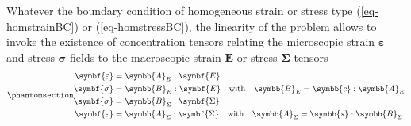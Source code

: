 \documentclass[
  a4paper,
  numbers=noendperiod,
  DIV=12]{scrreprt}
\newcommand{\uu}[1]{{\symbf{{#1}}}}
\newcommand{\uuuu}[1]{{\symbb{{#1}}}}
\newcommand{\eps}{{\uu{{\varepsilon}}}}
\newcommand{\E}{{\uu{{E}}}}
\newcommand{\sig}{{\uu{{\sigma}}}}
\newcommand{\Sig}{{\uu{{\Sigma}}}}
\begin{document}
Whatever the boundary condition of homogeneous strain or stress type
(\ref{eq-homstrainBC}) or (\ref{eq-homstressBC}), the linearity of the
problem allows to invoke the existence of concentration tensors relating
the microscopic strain \(\eps\) and stress \(\sig\) fields to the
macroscopic strain \(\E\) or stress \(\Sig\) tensors
\begin{equation}\phantomsection\label{eq-conc}{\begin{aligned}
\eps & =  \uuuu{A}_E:\E \\
\sig & =  \uuuu{B}_E:\E \quad\textrm{with}\quad \uuuu{B}_E=\uuuu{c}:\uuuu{A}_E \\
\sig & =  \uuuu{B}_\Sigma:\Sig \\
\eps & =  \uuuu{A}_\Sigma:\Sig \quad\textrm{with}\quad \uuuu{A}_\Sigma=\uuuu{s}:\uuuu{B}_\Sigma 
\end{aligned}}\end{equation}
\end{document}
